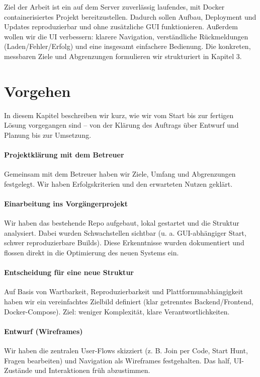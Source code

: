 \documentclass[oneside]{ausarbeitung}
\begin{document}
Ziel der Arbeit ist ein auf dem Server zuverlässig laufendes, mit Docker containerisiertes Projekt bereitzustellen. Dadurch sollen Aufbau, Deployment und Updates reproduzierbar und ohne zusätzliche GUI funktionieren. Außerdem wollen wir die UI verbessern: klarere Navigation, verständliche Rückmeldungen (Laden/Fehler/Erfolg) und eine insgesamt einfachere Bedienung. Die konkreten, messbaren Ziele und Abgrenzungen formulieren wir strukturiert in Kapitel 3.

\section{Vorgehen}
\label{sec:vorgehen}

In diesem Kapitel beschreiben wir kurz, wie wir vom Start bis zur fertigen Lösung vorgegangen sind – von der Klärung des Auftrags über Entwurf und Planung bis zur Umsetzung.

\paragraph{Projektklärung mit dem Betreuer} 
Gemeinsam mit dem Betreuer haben wir Ziele, Umfang und Abgrenzungen festgelegt. Wir haben Erfolgskriterien und den erwarteten Nutzen geklärt.

\paragraph{Einarbeitung ins Vorgängerprojekt} 
Wir haben das bestehende Repo aufgebaut, lokal gestartet und die Struktur analysiert. Dabei wurden Schwachstellen sichtbar (u. a. GUI-abhängiger Start, schwer reproduzierbare Builds). Diese Erkenntnisse wurden dokumentiert und flossen direkt in die Optimierung des neuen Systems ein.

\paragraph{Entscheidung für eine neue Struktur}
Auf Basis von Wartbarkeit, Reproduzierbarkeit und Plattformunabhängigkeit haben wir ein vereinfachtes Zielbild definiert (klar getrenntes Backend/Frontend, Docker-Compose). Ziel: weniger Komplexität, klare Verantwortlichkeiten.

\paragraph{Entwurf (Wireframes)}
Wir haben die zentralen User-Flows skizziert (z. B. Join per Code, Start Hunt, Fragen bearbeiten) und Navigation als Wireframes festgehalten. Das half, UI-Zustände und Interaktionen früh abzustimmen.
\end{document}
